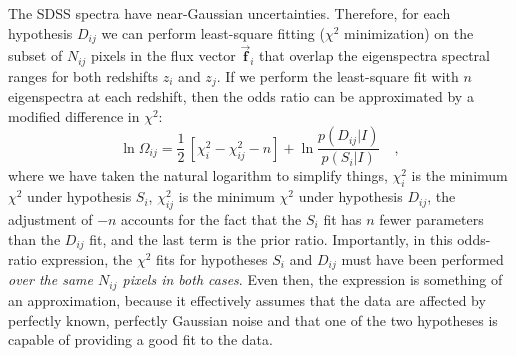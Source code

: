 \documentclass[12pt]{article}
\newcommand{\hoggvector}[1]{\boldsymbol{\vec{#1}}}
\newcommand{\fvec}{\hoggvector{f}}
\begin{document}
The SDSS spectra have near-Gaussian uncertainties.
Therefore, for each hypothesis $D_{ij}$ we can perform least-square
fitting ($\chi^2$ minimization) on the subset of $N_{ij}$ pixels in
the flux vector $\fvec_i$ that overlap the eigenspectra spectral
ranges for both redshifts $z_i$ and $z_j$.  If we perform the
least-square fit with $n$ eigenspectra at each redshift, then the odds
ratio can be approximated by a modified difference in $\chi^2$:
\begin{equation}
\ln\Omega_{ij}= \frac{1}{2}\,\left[\chi^2_i-\chi^2_{ij}-n\right]
 +\ln\frac{p(D_{ij}|I)}{p(S_i|I)} \quad,
\end{equation}
where we have taken the natural logarithm to simplify things,
$\chi^2_i$ is the minimum $\chi^2$ under hypothesis $S_i$,
$\chi^2_{ij}$ is the minimum $\chi^2$ under hypothesis $D_{ij}$, the
adjustment of $-n$ accounts for the fact that the $S_i$ fit has $n$
fewer parameters than the $D_{ij}$ fit, and the last term is the prior
ratio.  Importantly, in this odds-ratio expression, the $\chi^2$ fits
for hypotheses $S_i$ and $D_{ij}$ must have been performed \emph{over
the same $N_{ij}$ pixels in both cases}.  Even then, the expression is
something of an approximation, because it effectively assumes that the
data are affected by perfectly known, perfectly Gaussian noise and
that one of the two hypotheses is capable of providing a good fit to
the data.
\end{document}
